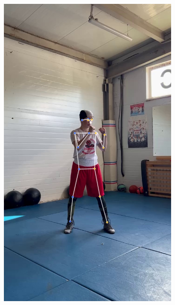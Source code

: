 \begin{figure}[h]
\begin{subfigure}[b]{0.24\textwidth}
	\centering
	\includegraphics[width=\textwidth]{./images/experiment/data_info/box_examples/ex_5}
\end{subfigure}
\begin{subfigure}[b]{0.24\textwidth}
	\centering

\end{subfigure}
\end{figure}
